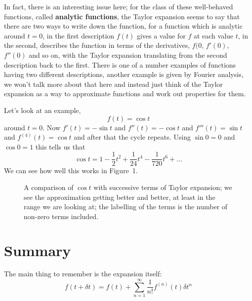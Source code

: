 \documentclass[12pt]{article}
\begin{document}
In fact, there is an interesting issue here; for the class of these
well-behaved functions, called \textbf{analytic functions}, the Taylor
expansion seems to say that there are two ways to write down the
function, for a function which is analytic around $t=0$, in the first
description $f(t)$ gives a value for $f$ at each value $t$, in the
second, describes the function in terms of the derivatives, $f(0$,
$f'(0)$, $f''(0)$ and so on, with the Taylor expansion translating
from the second description back to the first. There is one of a
number examples of functions having two different descriptions,
another example is given by Fourier analysis, we won't talk more about
that here and instead just think of the Taylor expansion as a way to
approximate functions and work out properties for them.

Let's look at an example,
\begin{equation}
  f(t)=\cos{t}
\end{equation}
around $t=0$. Now $f'(t)=-\sin{t}$ and $f''(t)=-\cos{t}$ and
$f'''(t)=\sin{t}$ and $f^{(4)}(t)=\cos{t}$ and after that the cycle
repeats. Using $\sin{0}=0$ and $\cos{0}=1$ this tells us that
\begin{equation}
  \cos{t}=1-\frac{1}{2}t^2+\frac{1}{24}t^4-\frac{1}{720}t^6+\ldots
\end{equation}
We can see how well this works in Figure~1.
\begin{figure}
  \begin{center}
    
    \end{center}
  \caption{A comparison of $\cos{t}$ with successive terms of Taylor expansion; we see the approximation getting better and better, at least in the range we are looking at; the labelling of the terms is the number of non-zero terms included.}
\end{figure}

\section*{Summary}
The main thing to remember is the expansion itself:
\begin{equation}
  f(t+\delta t)=f(t)+\sum_{n=1}^\infty \frac{1}{n!}f^{(n)}(t)\delta t^n
\end{equation}
\end{document}
